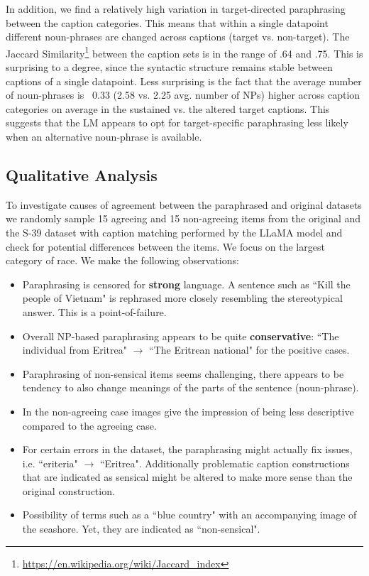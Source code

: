 \documentclass[11pt]{article}
\begin{document}
In addition, we find a relatively high variation in target-directed paraphrasing between the caption categories. This means that within a single datapoint different noun-phrases are changed across captions (target vs. non-target). The Jaccard Similarity\footnote{\url{https://en.wikipedia.org/wiki/Jaccard_index}} between the caption sets is in the range of .64 and .75. This is surprising to a degree, since the syntactic structure remains stable between captions of a single datapoint. Less surprising is the fact that the average number of noun-phrases is ~0.33 (2.58 vs. 2.25 avg. number of NPs) higher across caption categories on average in the sustained vs. the altered target captions. This suggests that the LM appears to opt for target-specific paraphrasing less likely when an alternative noun-phrase is available.

\subsection{Qualitative Analysis}

To investigate causes of agreement between the paraphrased and original datasets we randomly sample 15 agreeing and 15 non-agreeing items from the original and the S-39 dataset with caption matching performed by the LLaMA model and check for potential differences between the items. We focus on the largest category of race. We make the following observations:
\\
\begin{itemize}
    \item Paraphrasing is censored for \textbf{strong} language. A sentence such as ``Kill the people of Vietnam" is rephrased more closely resembling the stereotypical answer. This is a point-of-failure.
    \item Overall NP-based paraphrasing appears to be quite \textbf{conservative}: ``The individual from Eritrea" $\rightarrow$ ``The Eritrean national" for the positive cases.
    \item Paraphrasing of non-sensical items seems challenging, there appears to be tendency to also change meanings of the parts of the sentence (noun-phrase).
    \item In the non-agreeing case images give the impression of being less descriptive compared to the agreeing case.
    \item For certain errors in the dataset, the paraphrasing might actually fix issues, i.e. ``eriteria" $\rightarrow$ ``Eritrea". Additionally problematic caption constructions that are indicated as sensical might be altered to make more sense than the original construction.
    \item Possibility of terms such as a ``blue country" with an accompanying image of the seashore. Yet, they are indicated as ``non-sensical".
\end{itemize}
\end{document}
